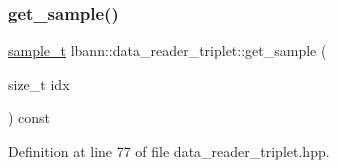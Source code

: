 \subsubsection{\texorpdfstring{get\+\_\+sample()}{get\_sample()}}
{\footnotesize\ttfamily \hyperlink{classlbann_1_1image__data__reader_a7580011ef6ef9da32e1a3bc49ad0706c}{sample\+\_\+t} lbann\+::data\+\_\+reader\+\_\+triplet\+::get\+\_\+sample (\begin{DoxyParamCaption}\item[{size\+\_\+t}]{idx }\end{DoxyParamCaption}) const\hspace{0.3cm}{\ttfamily [inline]}}



Definition at line 77 of file data\+\_\+reader\+\_\+triplet.\+hpp.


